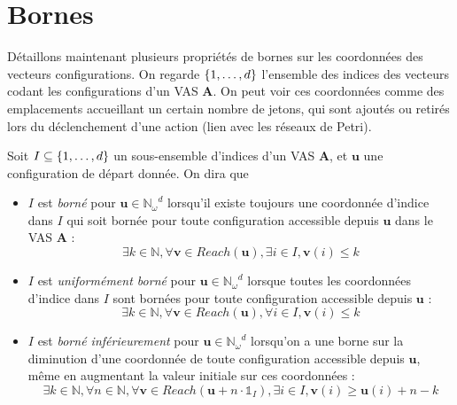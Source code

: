 \documentclass[a4paper,final]{article}
\let\leq\leqslant
\let\geq\geqslant
\newcommand{\os}[1]{\left\{\mathinner{#1}\right\}}
\newcommand{\N}{\ensuremath{\mathbb{N}}}
\newcommand{\Nomega}{\ensuremath{\mathbb{N}_\omega}}
\newcommand{\indicatrice}[1]{\ensuremath{\mathds{1}_{#1}}}
\newcommand{\vect}[1]{\ensuremath{\mathbf{#1}}}
\newcommand{\ensaction}{\ensuremath{\mathbf{A}}}
\newcommand{\reach}[1]{\ensuremath{\mathit{Reach}(#1)}}
\begin{document}

\section{Bornes}

Détaillons maintenant plusieurs propriétés de bornes sur les coordonnées des vecteurs configurations.
On regarde $\os{1,\dots,d}$ l'ensemble des indices des vecteurs codant les configurations d'un VAS $\ensaction$.
On peut voir ces coordonnées comme des emplacements accueillant un certain nombre de jetons, qui sont ajoutés ou retirés lors du déclenchement d'une action (lien avec les réseaux de Petri).

Soit $I\subseteq \os{1,\dots,d}$ un sous-ensemble d'indices d'un VAS $\ensaction$, et $\vect{u}$ une configuration de départ donnée.
On dira que
\begin{itemize}
    \item $I$ est \emph{borné} pour $\vect{u}\in \Nomega^d$ lorsqu'il existe toujours une coordonnée d'indice dans $I$ qui soit bornée pour toute configuration accessible depuis $\vect{u}$ dans le VAS $\ensaction$ :
    $$\exists k\in\N, \forall \vect{v}\in\reach{\vect{u}}, \exists i\in I, \vect{v}(i)\leq k$$
    
    \item $I$ est \emph{uniformément borné} pour $\vect{u}\in \Nomega^d$ lorsque toutes les coordonnées d'indice dans $I$ sont bornées pour toute configuration accessible depuis $\vect{u}$ :
    $$\exists k\in\N, \forall \vect{v}\in\reach{\vect{u}}, \forall i\in I, \vect{v}(i)\leq k$$
    
    \item $I$ est \emph{borné inférieurement} pour $\vect{u}\in \Nomega^d$ lorsqu'on a une borne sur la diminution d'une coordonnée de toute configuration accessible depuis $\vect{u}$, même en augmentant la valeur initiale sur ces coordonnées :
    $$\exists k\in\N, \forall n\in\N, \forall \vect{v}\in\reach{\vect{u} + n\cdot\indicatrice{I}}, \exists i\in I, \vect{v}(i)\geq \vect{u}(i)+n-k$$
\end{itemize}

\end{document}

